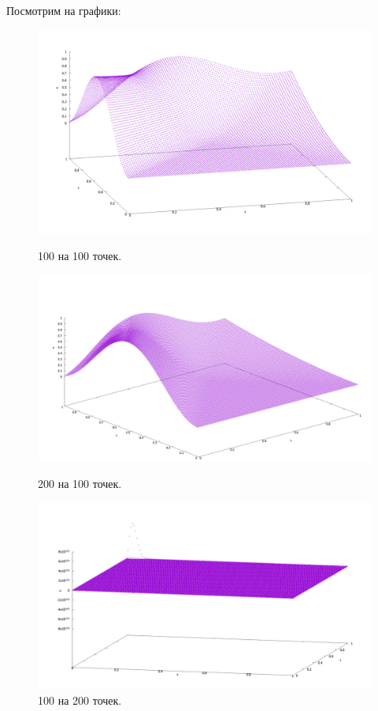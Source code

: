 \documentclass{article}
\begin{document}
Посмотрим на графики: 
	\begin{figure}[h]
	\centering 
	\begin{minipage}{0.45\textwidth}
		\centering
		\includegraphics[width=\textwidth]{image_1.png}
		\caption{100 на 100 точек.}
	\end{minipage}
	\hfill
	\begin{minipage}{0.45\textwidth}
		\centering
		\includegraphics[width=\textwidth]{image_2.png}
		\caption{200 на 100 точек.}
	\end{minipage}
	\hfill
	\newline
	\begin{minipage}{0.45\textwidth}
		\centering
		\includegraphics[width=\textwidth]{image_4.png}
		\caption{100 на 200 точек.}
	\end{minipage}
	
	
\end{figure}
	
\end{document}

